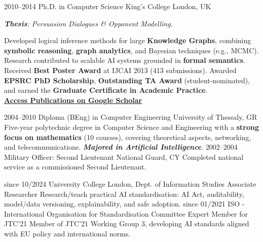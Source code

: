 \documentclass[]{../../../../friggeri-cv}
\begin{document}
\begin{entrylist2}
    \entrytwo
        {\small 2010--2014}
        {\small Ph.D. in Computer Science}
        {\small King's College London, UK}
        {\small \emph{\textbf{Thesis}: Persuasion Dialogues \& Opponent Modelling.}

        {\footnotesize Developed logical inference methods for large \textbf{Knowledge Graphs}, combining \textbf{symbolic reasoning}, \textbf{graph analytics}, and Bayesian techniques (e.g., MCMC). Research contributed to scalable AI systems grounded in \textbf{formal semantics}. Received \textbf{Best Poster Award} at IJCAI 2013 (413 submissions). Awarded \textbf{EPSRC PhD Scholarship}, \textbf{Outstanding TA Award} (student-nominated), and earned the \textbf{Graduate Certificate in Academic Practice}.
        \\ \textbf{\textcolor{blue}{\href{https://scholar.google.com/citations?hl=en&user=Rr3KTx8AAAAJ}{\underline{Access Publications on Google Scholar}}}}}
        }
    \entrytwo
        {\small  2004--2010}
        {\small Diploma (BEng) in Computer Engineering}
        {\small University of Thessaly, GR}
        {\footnotesize Five-year polytechnic degree in Computer Science and Engineering with a \textbf{strong focus on mathematics} (10 courses), covering theoretical aspects, networking, and telecommunications. \emph{\textbf{Majored in Artificial Intelligence}}.}
    \entrytwo
        {\small  2002--2004}
        {\small Military Officer: Second Lieutenant}
        {\small National Guard, CY}
        {\small Completed national service as a commissioned Second Lieutenant.}
\end{entrylist2}
\begin{entrylist2}
    \entrytwo
        {\footnotesize since 10/2024}
        {\small University College London, Dept. of Information Studies}
        {\small Associate Researcher}
        {\small Research/teach practical AI standardisation: AI Act, auditability, model/data versioning, explainability, and safe adoption.}
    \entrytwo
        {\footnotesize since 01/2021}
        {\small ISO - International Organisation for Standardisation}
        {\small Committee Expert Member for JTC'21}
        {\footnotesize Member of JTC'21 Working Group 3, developing AI standards aligned with EU policy and international norms.}
\end{entrylist2}
\end{document}

